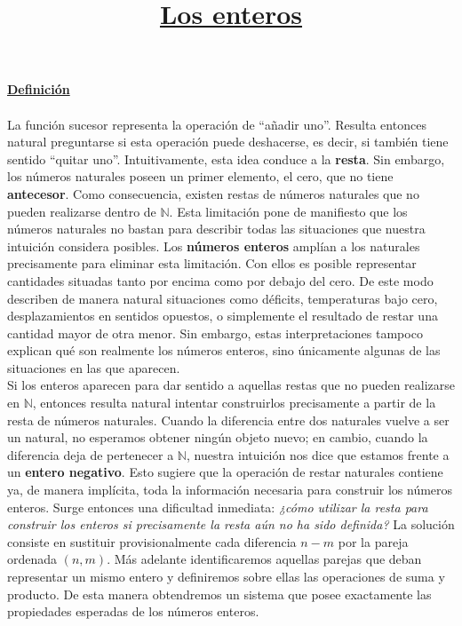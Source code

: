 \documentclass[10 pt]{article}
\title{\textbf{\underline{Los enteros}}}
\author{}
\date{}
\begin{document}
\pagestyle{empty}
\maketitle
\thispagestyle{empty}

\section*{}

\LARGE{\textbf{\underline{Definición}}}\\ \\

\Large{La función sucesor representa la operación de ``añadir uno''. Resulta entonces natural preguntarse si esta operación puede deshacerse, es decir, si también tiene sentido ``quitar uno''. Intuitivamente, esta idea conduce a la \textbf{resta}. Sin embargo, los números naturales poseen un primer elemento, el cero, que no tiene \textbf{antecesor}. Como consecuencia, existen restas de números naturales que no pueden realizarse dentro de $\mathbb N$. Esta limitación pone de manifiesto que los números naturales no bastan para describir todas las situaciones que nuestra intuición considera posibles. Los \textbf{números enteros} amplían a los naturales precisamente para eliminar esta limitación. Con ellos es posible representar cantidades situadas tanto por encima como por debajo del cero. De este modo describen de manera natural situaciones como déficits, temperaturas bajo cero, desplazamientos en sentidos opuestos, o simplemente el resultado de restar una cantidad mayor de otra menor. Sin embargo, estas interpretaciones tampoco explican qué son realmente los números enteros, sino únicamente algunas de las situaciones en las que aparecen.} \\

\Large{Si los enteros aparecen para dar sentido a aquellas restas que no pueden realizarse en $\mathbb N$, entonces resulta natural intentar construirlos precisamente a partir de la resta de números naturales. Cuando la diferencia entre dos naturales vuelve a ser un natural, no esperamos obtener ningún objeto nuevo; en cambio, cuando la diferencia deja de pertenecer a $\mathbb N$, nuestra intuición nos dice que estamos frente a un \textbf{entero negativo}. Esto sugiere que la operación de restar naturales contiene ya, de manera implícita, toda la información necesaria para construir los números enteros. Surge entonces una dificultad inmediata: \textit{¿cómo utilizar la resta para construir los enteros si precisamente la resta aún no ha sido definida?} La solución consiste en sustituir provisionalmente cada diferencia $n-m$ por la pareja ordenada $(n,m)$. Más adelante identificaremos aquellas parejas que deban representar un mismo entero y definiremos sobre ellas las operaciones de suma y producto. De esta manera obtendremos un sistema que posee exactamente las propiedades esperadas de los números enteros.} \\
\end{document}
